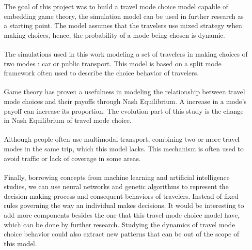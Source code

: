 The goal of this project was to build a travel mode choice model capable of embedding game theory, the simulation model can be used in further research as a starting point. The model assumes that the travelers use mixed strategy when making choices, hence, the probability of a mode being chosen is dynamic. \\

\paragraph{}
The simulations used in this work modeling a set of travelers in making choices of two modes : car or public transport. This model is based on a split mode framework often used to describe the choice behavior of travelers.
\paragraph{}
Game theory has proven a usefulness in modeling the relationship between travel mode choices and their payoffs through Nash Equilibrium. A increase in a mode's payoff can increase its proportion. The evolution part of this study is the change in Nash Equilibrium of travel mode choice.
\paragraph{}
Although people often use multimodal transport, combining two or more travel modes in the same trip, which this model lacks. This mechanism is often used to avoid traffic or lack of coverage in some areas.
\paragraph{}Finally, borrowing concepts from machine learning and artificial intelligence studies, we can use neural networks and genetic algorithms to represent the decision making process and consequent behaviors of travelers. Instead of fixed rules governing the way an individual makes decisions. It would be interesting to add more components besides the one that this travel mode choice model have, which can be done by further research. Studying the dynamics of travel mode choice behavior could also extract new patterns that can be out of the scope of this model.